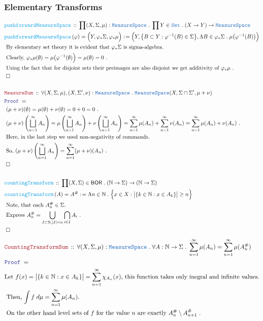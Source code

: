 \documentclass[12pt]{scrartcl}
\newcommand{\TYPE}[1]{\textcolor{NavyBlue}{\mathtt{#1}}}
\newcommand{\FUNC}[1]{\textcolor{Cerulean}{\mathtt{#1}}}
\newcommand{\LOGIC}[1]{\textcolor{Blue}{\mathtt{#1}}}
\newcommand{\THM}[1]{\textcolor{Maroon}{\mathtt{#1}}}
\renewcommand{\.}{\; . \;}
\newcommand{\de}{: \kern 0.1pc =}
\newcommand{\Act}[1]{\left( #1 \right)}
\newcommand{\Theorem}[2]{& \THM{#1} \, :: \, #2 \\ & \Proof = \\ }
\newcommand{\DeclareFunc}[2]{& \FUNC{#1} \, :: \, #2 \\}
\newcommand{\DefineNamedFunc}[4]{&  \FUNC{#1}\Act{#2} = #3 \de #4 \\}
\newcommand{\Page}[1]{ \begin{align*} #1 \end{align*}   }
\newcommand{\Nat}{\mathbb{N} }
\newcommand{\Set}{\TYPE{Set}}
\newcommand{\QED}{\; \square}
\newcommand{\EndProof}{& \QED \\}
\newcommand{\Proof}{\LOGIC{Proof} \; }
\newcommand{\Explain}[1]{& \text{#1.} \\}
\newcommand{\BOR}{\mathsf{BOR}}
\newcommand{\MS}{\TYPE{MeasureSpace}}
\begin{document}
\subsubsection{Elementary Transforms}
\Page{
	\DeclareFunc{pushforwardMeasureSpace}
	{
		\prod (X,\Sigma,\mu) : \MS \.
		\prod Y \in \Set \. 
		(X \to Y) \to \MS
	}
	\DefineNamedFunc{pushforwardMeasureSpace}
	{\varphi}{\Big(Y,\varphi_*\Sigma,\varphi_*\mu\Big)}
	{
		\Big( Y, \big\{ B \subset Y : \varphi^{-1}(B) \in \Sigma  \big\},
		\Lambda B \in  \varphi_*\Sigma \. \mu\big( \varphi^{-1}(B) \big)\Big)
	}
	\Explain{ By elementary set theory it is evident that $\varphi_*\Sigma$ is sigma-algebra}
	\Explain{ Clearly, 
		$\varphi_*\mu(\emptyset) = 
		\mu\big( \varphi^{-1}(\emptyset)\Big) = 
		\mu(\emptyset) = 0
		$ }
	\Explain{ Using the fact that for disjoint sets their preimages are also disjoint we get additivity of 
		$\varphi_*\mu$ }
	\EndProof
	\\
	\Theorem{MeasureSum}
	{
		\forall (X,\Sigma,\mu),(X,\Sigma',\nu) : \MS \.
		\MS(X,\Sigma \cap \Sigma',\mu + \nu)
	}
	\Explain{ $ (\mu + \nu)(\emptyset) = \mu(\emptyset) + \nu(\emptyset)  = 0 + 0 = 0$ }
	\Explain{
		$
			(\mu + \nu)\left( \bigsqcup^\infty_{n=1} A_n  \right) = 
			\mu\left( \bigsqcup^\infty_{n=1} A_n  \right)
			+
			\nu\left( \bigsqcup^\infty_{n=1} A_n  \right) =
			\sum^\infty_{n=1} \mu(A_n)
			+
			\sum^\infty_{n=1} \nu(A_n) =
			\sum^\infty_{n=1} \mu(A_n) + \nu(A_n) 
		$
	}
	\Explain{ Here, in the last step we used non-negativity of summands}
	\Explain{ So, 
		$  (\mu + \nu)\left( \bigsqcup^\infty_{n=1} A_n  \right)  =
		 \sum^\infty_{n=1} (\mu + \nu)(A_n)$
	}
	\EndProof
	\\
	\DeclareFunc{countingTransform}
	{
		\prod (X,\Sigma) \in \BOR \.
		(\Nat \to \Sigma) \to (\Nat \to \Sigma)
	}
	\DefineNamedFunc{countingTransform}{A}{A^\#}
	{
		\Lambda n \in \Nat \.
		\Big\{
			x \in X : \big| \{ k \in \Nat : x \in A_k  \} \big| \ge n 	
		\Big\}
	}
	\Explain{ Note, that each $A^\#_n \in \Sigma$}
	\Explain{ Express $A^\#_n = \bigcup_{I \subset \Nat,|I|=n} \bigcap_{i \in I} A_i  $  } 
	\EndProof
}\Page{
	\Theorem{CountingTransformSum}
	{
		\forall (X,\Sigma,\mu) : \MS \.
		\forall A : \Nat \to \Sigma \.
		\sum^\infty_{n=1} \mu(A_n) = \sum^\infty_{n=1} \mu(A^\#_{n})
	}
	\Explain{Let $f(x) = \big| \{ k \in \Nat : x \in A_k  \} \big| = \sum^\infty_{n=1} \chi_{A_n}(x)$,
		this function takes only inegral and infinite values}
	\Explain{
	Then, $\int f  \; d\mu = \sum^\infty_{n=1} \mu(A_n)$}
	\Explain{ 
		On the other hand level sets of $f$ 
		for the value $n$ are exactly $A^\#_n \setminus A^\#_{n+1}$ }
}
\end{document}
